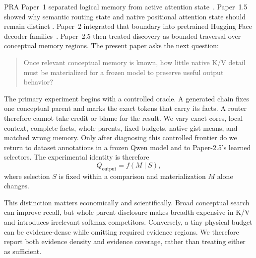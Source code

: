 \documentclass[11pt]{article}
\begin{document}
PRA Paper~1 separated logical memory from active attention state~\cite{simao2026pra}.  Paper~1.5
showed why semantic routing state and native positional attention state should remain distinct
\cite{simao2026position}.  Paper~2 integrated that boundary into pretrained Hugging Face decoder
families~\cite{simao2026hf}.  Paper~2.5 then treated discovery as bounded traversal over conceptual
memory regions.  The present paper asks the next question:
\begin{quote}
Once relevant conceptual memory is known, how little native K/V detail must be materialized for a
frozen model to preserve useful output behavior?
\end{quote}

The primary experiment begins with a controlled oracle.  A generated chain fixes one conceptual
parent and marks the exact tokens that carry its facts.  A router therefore cannot take credit or
blame for the result.  We vary exact cores, local context, complete facts, whole parents, fixed
budgets, native gist means, and matched wrong memory.  Only after diagnosing this controlled
frontier do we return to dataset annotations in a frozen Qwen model and to Paper-2.5's learned
selectors.  The experimental identity is therefore
\begin{equation}
 Q_{\mathrm{output}} = f(M\mid S),
\end{equation}
where selection $S$ is fixed within a comparison and materialization $M$ alone changes.

This distinction matters economically and scientifically.  Broad conceptual search can improve
recall, but whole-parent disclosure makes breadth expensive in K/V and introduces irrelevant
softmax competitors.  Conversely, a tiny physical budget can be evidence-dense while omitting
required evidence regions.  We therefore report both evidence density and evidence coverage,
rather than treating either as sufficient.
\end{document}
